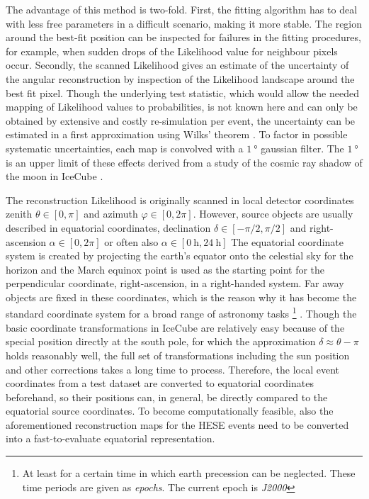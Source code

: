 The advantage of this method is two-fold.
First, the fitting algorithm has to deal with less free parameters in a difficult scenario, making it more stable.
The region around the best-fit position can be inspected for failures in the fitting procedures, for example, when sudden drops of the Likelihood value for neighbour pixels occur.
Secondly, the scanned Likelihood gives an estimate of the uncertainty of the angular reconstruction by inspection of the Likelihood landscape around the best fit pixel.
Though the underlying test statistic, which would allow the needed mapping of Likelihood values to probabilities, is not known here and can only be obtained by extensive and costly re-simulation per event, the uncertainty can be estimated in a first approximation using Wilks' theorem .
To factor in possible systematic uncertainties, each map is convolved with a $\SI{1}{\degree}$ gaussian filter.
The $\SI{1}{\degree}$ is an upper limit of these effects derived from a study of the cosmic ray shadow of the moon in IceCube .

The reconstruction Likelihood is originally scanned in local detector coordinates zenith $\theta\in[0, \pi]$ and azimuth $\varphi\in[0, 2\pi]$.
However, source objects are usually described in equatorial coordinates, declination $\delta\in[-\pi/2, \pi/2]$ and right-ascension $\alpha\in[0, 2\pi]$ or often also $\alpha\in[\SI{0}{\hour}, \SI{24}{\hour}]$
The equatorial coordinate system is created by projecting the earth's equator onto the celestial sky for the horizon and the March equinox point is used as the starting point for the perpendicular coordinate, right-ascension, in a right-handed system.
Far away objects are fixed in these coordinates, which is the reason why it has become the standard coordinate system for a broad range of astronomy tasks \footnote{At least for a certain time in which earth precession can be neglected. These time periods are given as \emph{epochs}. The current epoch is \emph{J2000}} .
Though the basic coordinate transformations in IceCube are relatively easy because of the special position directly at the south pole, for which the approximation $\delta \approx \theta-\pi$ holds reasonably well, the full set of transformations including the sun position and other corrections takes a long time to process.
Therefore, the local event coordinates from a test dataset are converted to equatorial coordinates beforehand, so their positions can, in general, be directly compared to the equatorial source coordinates.
To become computationally feasible, also the aforementioned reconstruction maps for the HESE events need to be converted into a fast-to-evaluate equatorial representation.

